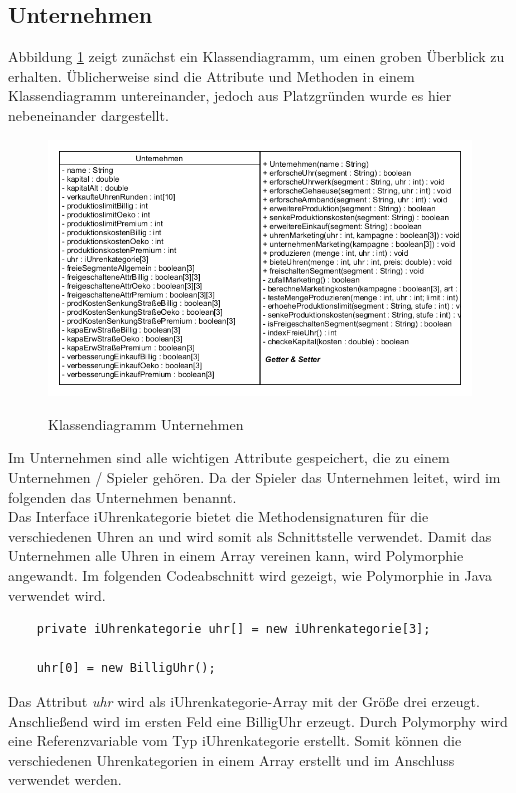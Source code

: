 \newpage
\subsection{Unternehmen}
Abbildung \ref{fig:KlassUnternehmen} zeigt zunächst ein Klassendiagramm, um einen groben Überblick zu erhalten. Üblicherweise sind die Attribute und Methoden in einem Klassendiagramm untereinander, jedoch aus Platzgründen wurde es hier nebeneinander dargestellt.
\begin{figure} [h]
	\centering
	\includegraphics[scale=0.6]{img/Unternehmen.png} 
	\label{fig:KlassUnternehmen}
	\caption{Klassendiagramm Unternehmen}
\end{figure}

Im Unternehmen sind alle wichtigen Attribute gespeichert, die zu einem Unternehmen / Spieler gehören. Da der Spieler das Unternehmen leitet, wird im folgenden das Unternehmen benannt. \\

Das Interface iUhrenkategorie bietet die Methodensignaturen für die verschiedenen Uhren an und wird somit als Schnittstelle verwendet. Damit das Unternehmen alle Uhren in einem Array vereinen kann, wird Polymorphie angewandt. Im folgenden Codeabschnitt wird gezeigt, wie Polymorphie in Java verwendet wird. \\

\begin{lstlisting}
	private iUhrenkategorie uhr[] = new iUhrenkategorie[3];
	
	uhr[0] = new BilligUhr();
\end{lstlisting}
Das Attribut \textit{uhr} wird als iUhrenkategorie-Array mit der Größe drei erzeugt. Anschließend wird im ersten Feld eine BilligUhr erzeugt. Durch Polymorphy wird eine Referenzvariable vom Typ iUhrenkategorie erstellt. Somit können die verschiedenen Uhrenkategorien in einem Array erstellt und im Anschluss verwendet werden. 

